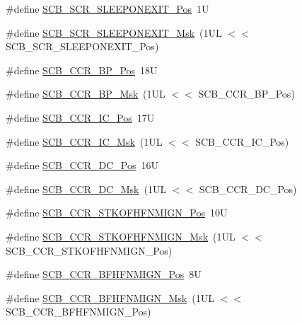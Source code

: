 \begin{DoxyCompactItemize}
\#define \mbox{\hyperlink{group___c_m_s_i_s___s_c_b_ga3680a15114d7fdc1e25043b881308fe9}{S\+C\+B\+\_\+\+S\+C\+R\+\_\+\+S\+L\+E\+E\+P\+O\+N\+E\+X\+I\+T\+\_\+\+Pos}}~1U
\item 
\#define \mbox{\hyperlink{group___c_m_s_i_s___s_c_b_ga50a243e317b9a70781b02758d45b05ee}{S\+C\+B\+\_\+\+S\+C\+R\+\_\+\+S\+L\+E\+E\+P\+O\+N\+E\+X\+I\+T\+\_\+\+Msk}}~(1\+U\+L $<$$<$ S\+C\+B\+\_\+\+S\+C\+R\+\_\+\+S\+L\+E\+E\+P\+O\+N\+E\+X\+I\+T\+\_\+\+Pos)
\item 
\#define \mbox{\hyperlink{group___c_m_s_i_s___s_c_b_ga2a729c850e865d602bbf25852c7d44fe}{S\+C\+B\+\_\+\+C\+C\+R\+\_\+\+B\+P\+\_\+\+Pos}}~18U
\item 
\#define \mbox{\hyperlink{group___c_m_s_i_s___s_c_b_ga7fac248cabee94546aa9530d27217772}{S\+C\+B\+\_\+\+C\+C\+R\+\_\+\+B\+P\+\_\+\+Msk}}~(1\+U\+L $<$$<$ S\+C\+B\+\_\+\+C\+C\+R\+\_\+\+B\+P\+\_\+\+Pos)
\item 
\#define \mbox{\hyperlink{group___c_m_s_i_s___s_c_b_ga33f0f2a0818b2570f3e00b7e79501448}{S\+C\+B\+\_\+\+C\+C\+R\+\_\+\+I\+C\+\_\+\+Pos}}~17U
\item 
\#define \mbox{\hyperlink{group___c_m_s_i_s___s_c_b_gaf2ff8f5957edac919e28b536aa6c0a59}{S\+C\+B\+\_\+\+C\+C\+R\+\_\+\+I\+C\+\_\+\+Msk}}~(1\+U\+L $<$$<$ S\+C\+B\+\_\+\+C\+C\+R\+\_\+\+I\+C\+\_\+\+Pos)
\item 
\#define \mbox{\hyperlink{group___c_m_s_i_s___s_c_b_gaa1896a99252649cfb96139b56ba87d9b}{S\+C\+B\+\_\+\+C\+C\+R\+\_\+\+D\+C\+\_\+\+Pos}}~16U
\item 
\#define \mbox{\hyperlink{group___c_m_s_i_s___s_c_b_ga57b3909dff40a9c28ec50991e4202678}{S\+C\+B\+\_\+\+C\+C\+R\+\_\+\+D\+C\+\_\+\+Msk}}~(1\+U\+L $<$$<$ S\+C\+B\+\_\+\+C\+C\+R\+\_\+\+D\+C\+\_\+\+Pos)
\item 
\#define \mbox{\hyperlink{group___c_m_s_i_s___s_c_b_ga98372e0d55ce8573350ce36c500e0555}{S\+C\+B\+\_\+\+C\+C\+R\+\_\+\+S\+T\+K\+O\+F\+H\+F\+N\+M\+I\+G\+N\+\_\+\+Pos}}~10U
\item 
\#define \mbox{\hyperlink{group___c_m_s_i_s___s_c_b_gaf7004d71376738038e912def01c31fe8}{S\+C\+B\+\_\+\+C\+C\+R\+\_\+\+S\+T\+K\+O\+F\+H\+F\+N\+M\+I\+G\+N\+\_\+\+Msk}}~(1\+U\+L $<$$<$ S\+C\+B\+\_\+\+C\+C\+R\+\_\+\+S\+T\+K\+O\+F\+H\+F\+N\+M\+I\+G\+N\+\_\+\+Pos)
\item 
\#define \mbox{\hyperlink{group___c_m_s_i_s___s_c_b_ga4010a4f9e2a745af1b58abe1f791ebbf}{S\+C\+B\+\_\+\+C\+C\+R\+\_\+\+B\+F\+H\+F\+N\+M\+I\+G\+N\+\_\+\+Pos}}~8U
\item 
\#define \mbox{\hyperlink{group___c_m_s_i_s___s_c_b_ga89a28cc31cfc7d52d9d7a8fcc69c7eac}{S\+C\+B\+\_\+\+C\+C\+R\+\_\+\+B\+F\+H\+F\+N\+M\+I\+G\+N\+\_\+\+Msk}}~(1\+U\+L $<$$<$ S\+C\+B\+\_\+\+C\+C\+R\+\_\+\+B\+F\+H\+F\+N\+M\+I\+G\+N\+\_\+\+Pos)

\end{DoxyCompactItemize}
